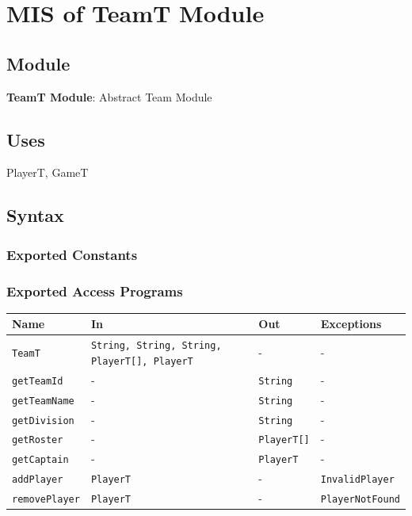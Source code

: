\documentclass[12pt, titlepage]{article}
\begin{document}
\section{MIS of TeamT Module} \label{TeamModule}

\subsection{Module}
\textbf{TeamT Module}: Abstract Team Module

\subsection{Uses}
PlayerT, GameT

\subsection{Syntax}

\subsubsection{Exported Constants}

\subsubsection{Exported Access Programs}

\begin{center}
  \begin{tabular}{p{4cm} p{4cm} p{4cm} p{3cm}}
    \toprule
    \textbf{Name}         & \textbf{In}                                         & \textbf{Out}       & \textbf{Exceptions}     \\
    \midrule
    \texttt{TeamT}        & \texttt{String, String, String, PlayerT[], PlayerT} & -                  & -                       \\
    \texttt{getTeamId}    & -                                                   & \texttt{String}    & -                       \\
    \texttt{getTeamName}  & -                                                   & \texttt{String}    & -                       \\
    \texttt{getDivision}  & -                                                   & \texttt{String}    & -                       \\
    \texttt{getRoster}    & -                                                   & \texttt{PlayerT[]} & -                       \\
    \texttt{getCaptain}   & -                                                   & \texttt{PlayerT}   & -                       \\
    \texttt{addPlayer}    & \texttt{PlayerT}                                    & -                  & \texttt{InvalidPlayer}  \\
    \texttt{removePlayer} & \texttt{PlayerT}                                    & -                  & \texttt{PlayerNotFound} \\
    \bottomrule
  \end{tabular}
\end{center}
\end{document}
